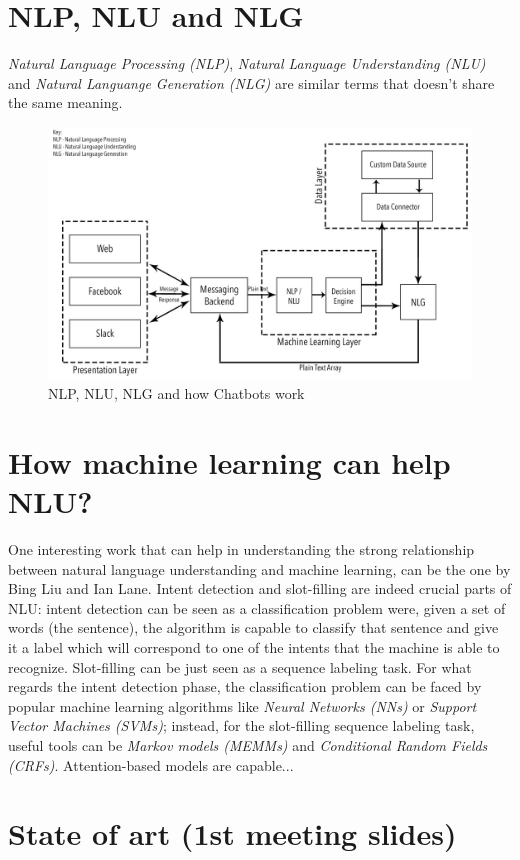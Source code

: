 \documentclass[a4paper,12pt]{report}
\begin{document}
	\section{NLP, NLU and NLG}
	\textit{Natural Language Processing (NLP)}, \textit{Natural Language Understanding (NLU)} and \textit{Natural Languange Generation (NLG)} are similar terms that doesn't share the same meaning. 
	\begin{figure}[H]
		\centering
		\includegraphics[scale=0.2]{nlschema}
		\caption{NLP, NLU, NLG and how Chatbots work\cite{nlpnlunlg}}
	\end{figure}
	
	\section{How machine learning can help NLU?}
	One interesting work that can help in understanding the strong relationship between natural language understanding and machine learning, can be the one by Bing Liu and Ian Lane\cite{rnn}. Intent detection and slot-filling are indeed crucial parts of NLU: intent detection can be seen as a classification problem were, given a set of words (the sentence), the algorithm is capable to classify that sentence and give it a label which will correspond to one of the intents that the machine is able to recognize. Slot-filling can be just seen as a sequence labeling task. For what regards the intent detection phase, the classification problem can be faced by popular machine learning algorithms like \textit{Neural Networks (NNs)} or \textit{Support Vector Machines (SVMs)}; instead, for the slot-filling sequence labeling task, useful tools can be \textit{Markov models (MEMMs)} and \textit{Conditional Random Fields (CRFs)}. Attention-based models are capable...
	\section{State of art (1st meeting slides)}
\end{document}
